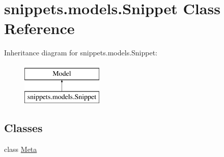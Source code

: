 \hypertarget{classsnippets_1_1models_1_1_snippet}{}\section{snippets.\+models.\+Snippet Class Reference}
\label{classsnippets_1_1models_1_1_snippet}
Inheritance diagram for snippets.\+models.\+Snippet\+:\begin{figure}[H]
\begin{center}
\leavevmode
\includegraphics[height=2.000000cm]{classsnippets_1_1models_1_1_snippet}
\end{center}
\end{figure}
\subsection*{Classes}
\begin{DoxyCompactItemize}
\item 
class \mbox{\hyperlink{classsnippets_1_1models_1_1_snippet_1_1_meta}{Meta}}
\end{DoxyCompactItemize}
